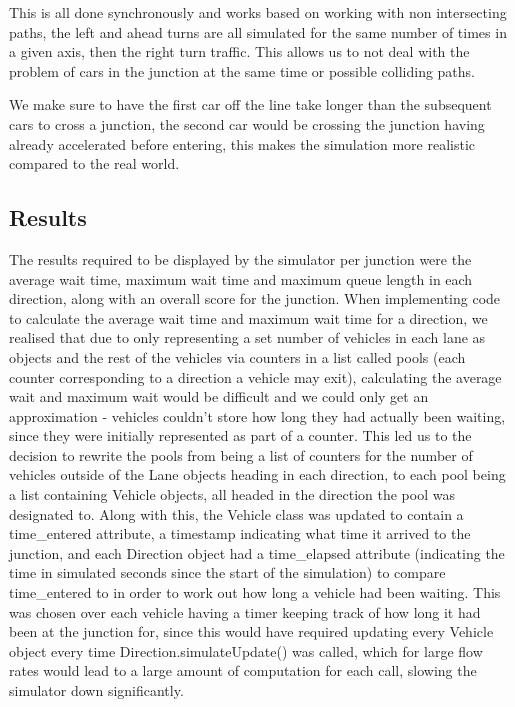 \documentclass{article}
\begin{document}
    This is all done synchronously and works based on working with non intersecting paths, the left and ahead turns are
    all simulated for the same number of times in a given axis, then the right turn traffic. This allows us to not deal
    with the problem of cars in the junction at the same time or possible colliding paths.

    We make sure to have the first car off the line take longer than the subsequent cars to cross a junction, the second
    car would be crossing the junction having already accelerated before entering, this makes the simulation more
    realistic compared to the real world.

    \subsection{Results}\label{subsec:results_backend}
    The results required to be displayed by the simulator per junction were the average wait time, maximum wait time and
    maximum queue length in each direction, along with an overall score for the junction. When implementing code to
    calculate the average wait time and maximum wait time for a direction, we realised that due to only representing a
    set number of vehicles in each lane as objects and the rest of the vehicles via counters in a list called pools
    (each counter corresponding to a direction a vehicle may exit), calculating the average wait and maximum wait would
    be difficult and we could only get an approximation - vehicles couldn’t store how long they had actually been waiting,
    since they were initially represented as part of a counter. This led us to the decision to rewrite the pools from being
    a list of counters for the number of vehicles outside of the Lane objects heading in each direction, to each pool being
    a list containing Vehicle objects, all headed in the direction the pool was designated to. Along with this, the Vehicle
    class was updated to contain a time\_entered attribute, a timestamp indicating what time it arrived to the junction,
    and each Direction object had a time\_elapsed attribute (indicating the time in simulated seconds since the start of
    the simulation) to compare time\_entered to in order to work out how long a vehicle had been waiting. This was chosen
    over each vehicle having a timer keeping track of how long it had been at the junction for, since this would have
    required updating every Vehicle object every time Direction.simulateUpdate() was called, which for large flow rates
    would lead to a large amount of computation for each call, slowing the simulator down significantly.
\end{document}
